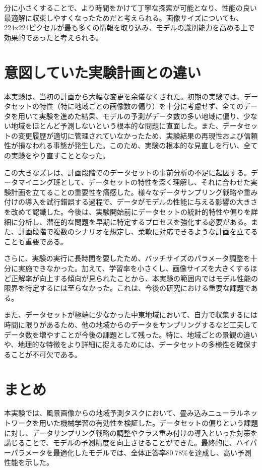 \documentclass[a4paper, 11pt, titlepage]{jsarticle}
\begin{document}
分に小さくすることで、より時間をかけて丁寧な探索が可能となり、性能の良い最適解に収束しやすくなったためだと考えられる。画像サイズについても、224x224ピクセルが最も多くの情報を取り込み、モデルの識別能力を高める上で効果的であったと考えられる。

\section{意図していた実験計画との違い}
本実験は、当初の計画から大幅な変更を余儀なくされた。初期の実験では、データセットの特性（特に地域ごとの画像数の偏り）を十分に考慮せず、全てのデータを用いて実験を進めた結果、モデルの予測がデータ数の多い地域に偏り、少ない地域をほとんど予測しないという根本的な問題に直面した。また、データセットの変更履歴が適切に管理されていなかったため、実験結果の再現性および信頼性が損なわれる事態が発生した。このため、実験の根本的な見直しを行い、全ての実験をやり直すこととなった。

この大きなズレは、計画段階でのデータセットの事前分析の不足に起因する。データマイニング班として、データセットの特性を深く理解し、それに合わせた実験計画を立てることの重要性を痛感した。様々なデータサンプリング戦略や重み付けの導入を試行錯誤する過程で、データがモデルの性能に与える影響の大きさを改めて認識した。今後は、実験開始前にデータセットの統計的特性や偏りを詳細に分析し、潜在的な問題を早期に特定するプロセスを強化する必要がある。また、計画段階で複数のシナリオを想定し、柔軟に対応できるような計画を立てることも重要である。

さらに、実験の実行に長時間を要したため、バッチサイズのパラメータ調整を十分に実施できなかった。加えて、学習率を小さくし、画像サイズを大きくするほど正解率が向上する傾向が見られたことから、本実験の範囲内ではモデル性能の限界を特定するには至らなかった。これは、今後の研究における重要な課題である。

また、データセットが極端に少なかった中東地域において、自力で収集するには時間に限りがあるため、他の地域からのデータをサンプリングするなど工夫してデータ数を増やすことが今後の課題として残った。特に、地域ごとの景観の違いや、地理的な特徴をより詳細に捉えるためには、データセットの多様性を確保することが不可欠である。

\section{まとめ}
本実験では、風景画像からの地域予測タスクにおいて、畳み込みニューラルネットワークを用いた機械学習の有効性を検証した。データセットの偏りという課題に対し、データサンプリング戦略の調整やクラス重み付けの導入といった対策を講じることで、モデルの予測精度を向上させることができた。最終的に、ハイパーパラメータを最適化したモデルでは、全体正答率80.78\%を達成し、高い予測性能を示した。
\end{document}
